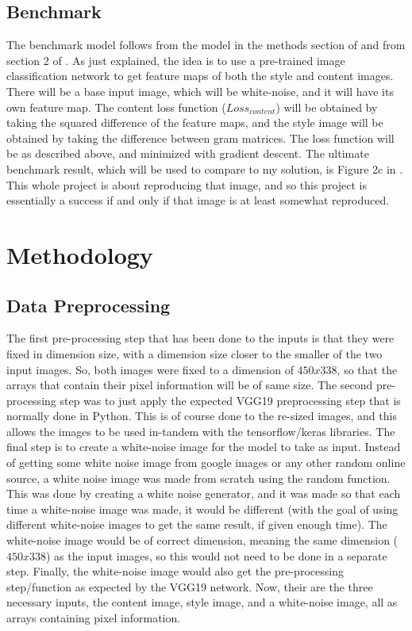 \documentclass[12pt]{article}
\begin{document}
\subsection{Benchmark}
The benchmark model follows from the model in the methods section of \cite{Neural} and from section 2 of \cite{Image}. As just explained, the idea is to use a pre-trained image classification network to get feature maps of both the style and content images. There will be a base input image, which will be white-noise, and it will have its own feature map. The content loss function ($Loss_{content}$) will be obtained by taking the squared difference of the feature maps, and the style image will be obtained by taking the difference between gram matrices. The loss function will be as described above, and minimized with gradient descent. The ultimate benchmark result, which will be used to compare to my solution, is Figure 2c in \cite{Neural}. This whole project is about reproducing that image, and so this project is essentially a success if and only if that image is at least somewhat reproduced. 

\section{Methodology}
\subsection{Data Preprocessing}
The first pre-processing step that has been done to the inputs is that they were fixed in dimension size, with a dimension size closer to the smaller of the two input images. So, both images were fixed to a dimension of $450x338$, so that the arrays that contain their pixel information will be of same size. The second pre-processing step was to just apply the expected VGG19 preprocessing step that is normally done in Python. This is of course done to the re-sized images, and this allows the images to be used in-tandem with the tensorflow/keras libraries. The final step is to create a white-noise image for the model to take as input. Instead of getting some white noise image from google images or any other random online source, a white noise image was made from scratch using the random function. This was done by creating a white noise generator, and it was made so that each time a white-noise image was made, it would be different (with the goal of using different white-noise images to get the same result, if given enough time). The white-noise image would be of correct dimension, meaning the same dimension ($450x338$) as the input images, so this would not need to be done in a separate step. Finally, the white-noise image would also get the pre-processing step/function as expected by the VGG19 network. Now, their are the three necessary inputs, the content image, style image, and a white-noise image, all as arrays containing pixel information.
\end{document}
